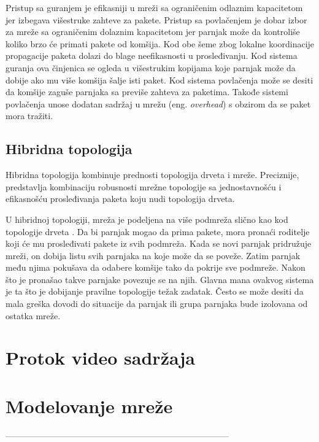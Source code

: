 \documentclass[12pt,oneside]{memoir}
\begin{document}
Pristup sa guranjem je efikasniji u mreži sa ograničenim odlaznim kapacitetom jer izbegava višestruke zahteve za pakete. Pristup sa povlačenjem je dobar izbor za mreže sa ograničenim dolaznim kapacitetom jer parnjak može da kontroliše koliko brzo će primati pakete od komšija. Kod obe šeme zbog lokalne koordinacije propagacije paketa dolazi do blage neefikasnosti u prosleđivanju. Kod sistema guranja ova činjenica se ogleda u višestrukim kopijama koje parnjak može da dobije ako mu više komšija šalje isti paket. Kod sistema povlačenja može se desiti da komšije zaguše parnjaka sa previše zahteva za paketima. Takođe sistemi povlačenja unose dodatan sadržaj u mrežu (eng. \textit{overhead}) s obzirom da se paket mora tražiti.

\subsection{Hibridna topologija}
\label{P2P.3.3}

Hibridna topologija kombinuje prednosti topologija drveta i mreže. Preciznije, predstavlja kombinaciju robusnosti mrežne topologije sa jednostavnošću i efikasnošću prosleđivanja paketa koju nudi topologija drveta.

U hibridnoj topologiji, mreža je podeljena na više podmreža slično kao kod topologije drveta \cite{Shen:2009}. Da bi parnjak mogao da prima pakete, mora pronaći roditelje koji će mu prosleđivati pakete iz svih podmreža. Kada se novi parnjak pridružuje mreži, on dobija listu svih parnjaka na koje može da se poveže. Zatim parnjak među njima pokušava da odabere komšije tako da pokrije sve podmreže. Nakon što je pronašao takve parnjake povezuje se na njih. Glavna mana ovakvog sistema je ta što je dobijanje pravilne topologije težak zadatak. Često se može desiti da mala greška dovodi do situacije da parnjak ili grupa parnjaka bude izolovana od ostatka mreže.

\section{Protok video sadržaja}
\label{P2P.4}


\section{Modelovanje mreže}
\label{P2P.5}


------------------------------------------------------------------------------

\end{document}

